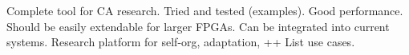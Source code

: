 \TODO
Complete tool for CA research.
Tried and tested (examples).
Good performance.
Should be easily extendable for larger FPGAs.
Can be integrated into current systems.
Research platform for self-org, adaptation, ++
List use cases.
